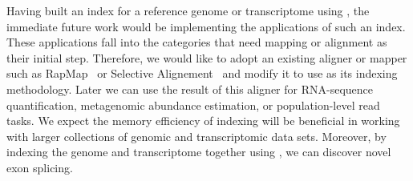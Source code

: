 Having built an index for a reference genome or transcriptome using \pufferfish, the immediate future work would be implementing the applications of such an index. These applications fall into the categories that need mapping or alignment as their initial step. Therefore, we would like to adopt an existing aligner or mapper such as RapMap~\cite{srivastava2016rapmap} or Selective Alignement~\cite{sarkar2017towards} and modify it to use \pufferfish as its indexing methodology. Later we can use the result of this aligner for RNA-sequence quantification, metagenomic abundance estimation, or population-level read tasks. We expect the memory efficiency of \pufferfish indexing will be beneficial in working with larger collections of genomic and transcriptomic data sets. Moreover, by indexing the genome and transcriptome together using \pufferfish, we can discover novel exon splicing. 
